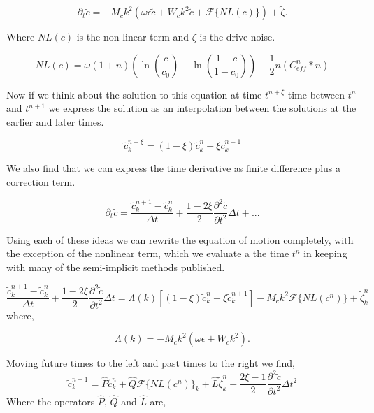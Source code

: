 \begin{equation}
\partial_t \tilde{c} = -M_c k^2\left(\omega\epsilon\tilde{c} + W_c k^2\tilde{c} + \mathcal{F}\lbrace NL(c) \rbrace\right) + \tilde{\zeta}.
\end{equation}

Where $NL(c)$ is the non-linear term and $\zeta$ is the drive noise. 

\begin{equation}
NL(c) = \omega(1+n)\left(\ln\left(\frac{c}{c_0}\right) - \ln\left(\frac{1-c}{1-c_0}\right)\right) - \frac{1}{2} n \left(C_{eff}^n\ast n\right)
\end{equation}

Now if we think about the solution to this equation at time $t^{n+\xi}$ time between $t^n$ and $t^{n+1}$ we express the solution as an interpolation between the solutions at the earlier and later times.

\begin{equation}
\tilde{c}_k^{n + \xi} = (1-\xi)\tilde{c}_k^n + \xi\tilde{c}_k^{n+1}
\end{equation}

We also find that we can express the time derivative as finite difference plus a correction term. 

\begin{equation}
\partial_t \tilde{c} = \frac{\tilde{c}_k^{n+1} - \tilde{c}_k^{n}}{\Delta t} + 
\frac{1 - 2\xi}{2} \frac{\partial^2 \tilde{c}}{\partial t^2}\Delta t + ...
\end{equation}

Using each of these ideas we can rewrite the equation of motion completely, with the exception of the nonlinear term, which we evaluate a the time $t^n$ in keeping with many of the semi-implicit methods published.

\begin{equation}
\frac{\tilde{c}_k^{n+1} - \tilde{c}_k^{n}}{\Delta t} + 
\frac{1 - 2\xi}{2} \frac{\partial^2 \tilde{c}}{\partial t^2}\Delta t = 
\Lambda(k)\left[(1-\xi)\tilde{c}_k^n + \xi\tilde{c}_k^{n+1}\right] - M_c k^2 \mathcal{F}\lbrace NL(c^n)\rbrace + \tilde{\zeta}_k^n
\end{equation}
where, 

\begin{equation}
\Lambda(k) = -M_c k^2\left(\omega\epsilon + W_c k^2\right).
\end{equation}

Moving future times to the left and past times to the right we find, 
\begin{equation}
\tilde{c}_k^{n+1} = \hat{P}\tilde{c}_k^n + \hat{Q}\mathcal{F}\lbrace NL(c^n)\rbrace_k + \hat{L}\tilde{\zeta}_k^n + \frac{2\xi - 1}{2}\frac{\partial^2 \tilde{c}}{\partial t^2}\Delta t^2
\end{equation}
Where the operators $\hat{P}$, $\hat{Q}$ and $\hat{L}$ are,

